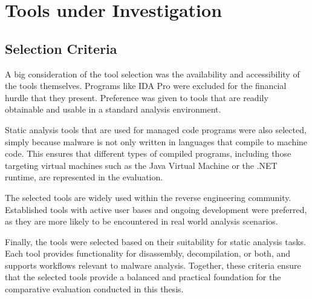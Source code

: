 \cleardoubleoddpage%
\chapter{Tools under Investigation}
\label{sec:tools}


\section{Selection Criteria}
\label{sec:tools:criteria}

A big consideration of the tool selection was the availability and accessibility of the tools themselves. Programs like IDA Pro were excluded for the financial hurdle that they present. 
Preference was given to tools that are readily obtainable and usable in a standard analysis environment.

Static analysis tools that are used for managed code programs were also selected, simply because malware is not only written in languages that compile to machine code. 
This ensures that different types of compiled programs, including those targeting virtual machines such as the Java Virtual Machine or the .NET runtime, are represented in the evaluation.

The selected tools are widely used within the reverse engineering community. Established tools with active user bases and ongoing development were preferred, 
as they are more likely to be encountered in real world analysis scenarios.

Finally, the tools were selected based on their suitability for static analysis tasks. Each tool provides functionality for disassembly, decompilation, or both, 
and supports workflows relevant to malware analysis. Together, these criteria ensure that the selected tools provide a balanced and practical foundation 
for the comparative evaluation conducted in this thesis.

